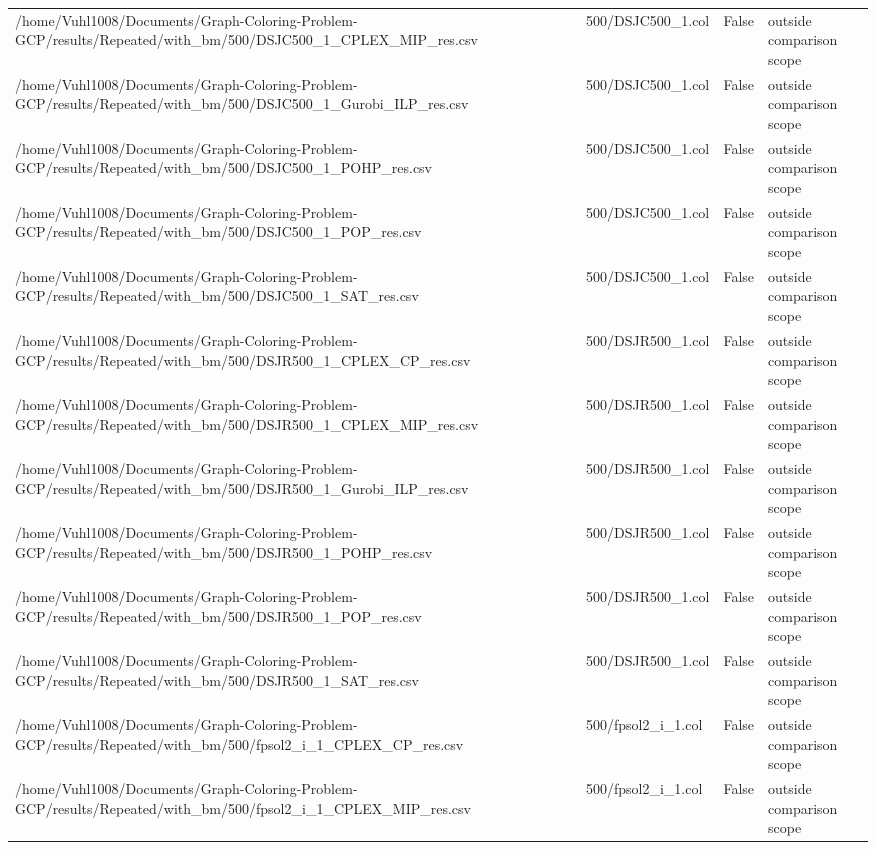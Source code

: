 \begin{table}[htbp]
\begin{tabular}{llll}
/home/Vuhl1008/Documents/Graph-Coloring-Problem-GCP/results/Repeated/with\_bm/500/DSJC500\_1\_CPLEX\_MIP\_res.csv & 500/DSJC500\_1.col & False & outside comparison scope \\
/home/Vuhl1008/Documents/Graph-Coloring-Problem-GCP/results/Repeated/with\_bm/500/DSJC500\_1\_Gurobi\_ILP\_res.csv & 500/DSJC500\_1.col & False & outside comparison scope \\
/home/Vuhl1008/Documents/Graph-Coloring-Problem-GCP/results/Repeated/with\_bm/500/DSJC500\_1\_POHP\_res.csv & 500/DSJC500\_1.col & False & outside comparison scope \\
/home/Vuhl1008/Documents/Graph-Coloring-Problem-GCP/results/Repeated/with\_bm/500/DSJC500\_1\_POP\_res.csv & 500/DSJC500\_1.col & False & outside comparison scope \\
/home/Vuhl1008/Documents/Graph-Coloring-Problem-GCP/results/Repeated/with\_bm/500/DSJC500\_1\_SAT\_res.csv & 500/DSJC500\_1.col & False & outside comparison scope \\
/home/Vuhl1008/Documents/Graph-Coloring-Problem-GCP/results/Repeated/with\_bm/500/DSJR500\_1\_CPLEX\_CP\_res.csv & 500/DSJR500\_1.col & False & outside comparison scope \\
/home/Vuhl1008/Documents/Graph-Coloring-Problem-GCP/results/Repeated/with\_bm/500/DSJR500\_1\_CPLEX\_MIP\_res.csv & 500/DSJR500\_1.col & False & outside comparison scope \\
/home/Vuhl1008/Documents/Graph-Coloring-Problem-GCP/results/Repeated/with\_bm/500/DSJR500\_1\_Gurobi\_ILP\_res.csv & 500/DSJR500\_1.col & False & outside comparison scope \\
/home/Vuhl1008/Documents/Graph-Coloring-Problem-GCP/results/Repeated/with\_bm/500/DSJR500\_1\_POHP\_res.csv & 500/DSJR500\_1.col & False & outside comparison scope \\
/home/Vuhl1008/Documents/Graph-Coloring-Problem-GCP/results/Repeated/with\_bm/500/DSJR500\_1\_POP\_res.csv & 500/DSJR500\_1.col & False & outside comparison scope \\
/home/Vuhl1008/Documents/Graph-Coloring-Problem-GCP/results/Repeated/with\_bm/500/DSJR500\_1\_SAT\_res.csv & 500/DSJR500\_1.col & False & outside comparison scope \\
/home/Vuhl1008/Documents/Graph-Coloring-Problem-GCP/results/Repeated/with\_bm/500/fpsol2\_i\_1\_CPLEX\_CP\_res.csv & 500/fpsol2\_i\_1.col & False & outside comparison scope \\
/home/Vuhl1008/Documents/Graph-Coloring-Problem-GCP/results/Repeated/with\_bm/500/fpsol2\_i\_1\_CPLEX\_MIP\_res.csv & 500/fpsol2\_i\_1.col & False & outside comparison scope \\

\end{tabular}
\end{table}
